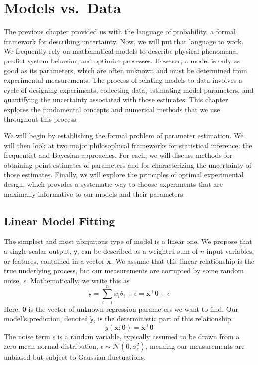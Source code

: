 \chapter{Models vs.\ Data}
\label{sec:models-vs-data}

The previous chapter provided us with the language of probability, a formal framework for describing uncertainty. Now, we will put that language to work. We frequently rely on mathematical models to describe physical phenomena, predict system behavior, and optimize processes. However, a model is only as good as its parameters, which are often unknown and must be determined from experimental measurements. The process of relating models to data involves a cycle of designing experiments, collecting data, estimating model parameters, and quantifying the uncertainty associated with those estimates. This chapter explores the fundamental concepts and numerical methods that we use throughout this process.

We will begin by establishing the formal problem of parameter estimation. We will then look at two major philosophical frameworks for statistical inference: the frequentist and Bayesian approaches. For each, we will discuss methods for obtaining point estimates of parameters and for characterizing the uncertainty of those estimates. Finally, we will explore the principles of optimal experimental design, which provides a systematic way to choose experiments that are maximally informative to our models and their parameters.

\section{Linear Model Fitting}
The simplest and most ubiquitous type of model is a linear one. We propose that a single scalar output, $\mathsf{y}$, can be described as a weighted sum of $n$ input variables, or features, contained in a vector $\mathbf{x}$. We assume that this linear relationship is the true underlying process, but our measurements are corrupted by some random noise, $\mathsf{\epsilon}$. Mathematically, we write this as
\begin{equation}
    \mathsf{y} = \sum_{i=1}^n x_i \theta_i + \mathsf{\epsilon} = \mathbf{x}^\top \boldsymbol{\theta} + \mathsf{\epsilon}
\end{equation}
Here, $\boldsymbol{\theta}$ is the vector of unknown regression parameters we want to find. Our model's prediction, denoted $\tilde{\mathsf{y}}$, is the deterministic part of this relationship:
\begin{equation}
    \tilde{y}(\mathbf{x}; \boldsymbol{\theta}) = \mathbf{x}^\top \boldsymbol{\theta}
\end{equation}
The noise term $\mathsf{\epsilon}$ is a random variable, typically assumed to be drawn from a zero-mean normal distribution, $\mathsf{\epsilon} \sim \mathcal{N}(0, \sigma^2_\epsilon)$, meaning our measurements are unbiased but subject to Gaussian fluctuations.

